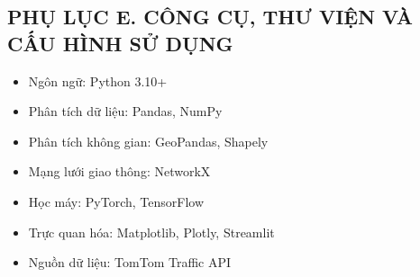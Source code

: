\subsection*{PHỤ LỤC E. CÔNG CỤ, THƯ VIỆN VÀ CẤU HÌNH SỬ DỤNG}

\begin{itemize}
    \item Ngôn ngữ: Python 3.10+
    \item Phân tích dữ liệu: Pandas, NumPy
    \item Phân tích không gian: GeoPandas, Shapely
    \item Mạng lưới giao thông: NetworkX
    \item Học máy: PyTorch, TensorFlow
    \item Trực quan hóa: Matplotlib, Plotly, Streamlit
    \item Nguồn dữ liệu: TomTom Traffic API
\end{itemize}
